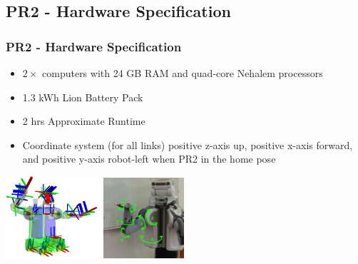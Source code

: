 \subsection{PR2 - Hardware Specification}
\begin{frame}
  \frametitle{PR2 - Hardware Specification}
\begin{itemize}
    \item $2\times$ computers with 24 GB RAM and quad-core Nehalem processors
    \item 1.3 kWh Lion Battery Pack
    \item 2 hrs Approximate Runtime
    \item Coordinate system (for all links) positive z-axis up, positive x-axis forward, and positive y-axis robot-left when PR2 in the home pose
    
\end{itemize}

\hspace{12ex}\includegraphics[width=3.5cm]{../images/pr2_frames.png}
\includegraphics[width=3cm]{../images/pr2arm_dof.jpg}
\end{frame}


